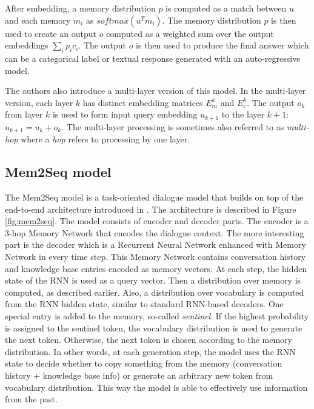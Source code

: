 After embedding, a memory distribution $p$ is computed as a match between $u$ and each memory $m_i$ as $softmax (u^Tm_i)$.
The memory distribution $p$ is then used to create an output $o$ computed as a weighted sum over the output embeddings $\sum_i p_ic_i$.
The output $o$ is then used to produce the final answer which can be a categorical label or textual response generated with an auto-regressive model.

The authors also introduce a multi-layer version of this model.
In the multi-layer version, each layer $k$ has distinct embedding matrices $E^k_m$ and $E^k_c$. The output $o_k$ from layer $k$ is used to form input query embedding $u_{k+1}$ to the layer $k+1$: $u_{k+1} = u_k + o_k$.
The multi-layer processing is sometimes also referred to as \emph{multi-hop} where a \emph{hop} refers to processing by one layer.

\subsection{Mem2Seq model}
\label{02:sec:mem2seq}
The Mem2Seq model \cite{madotto-etal-2018-mem2seq} is a task-oriented dialogue model that builds on top of the end-to-end architecture introduced in \citet{sukhbaatar2015end}.
The architecture is described in Figure \ref{fig:mem2seq}.
The model consists of encoder and decoder parts.
The encoder is a 3-hop Memory Network that encodes the dialogue context.
The more interesting part is the decoder which is a Recurrent Neural Network enhanced with Memory Network in every time step.
This Memory Network contains conversation history and knowledge base entries encoded as memory vectors.
At each step, the hidden state of the RNN is used as a query vector. Then a distribution over memory is computed, as described earlier. 
Also, a distribution over vocabulary is computed from the RNN hidden state, similar to standard RNN-based decoders.
One special entry is added to the memory, so-called \emph{sentinel}.
If the highest probability is assigned to the sentinel token, the vocabulary distribution is used to generate the next token.
Otherwise, the next token is chosen according to the memory distribution.
In other words, at each generation step, the model uses the RNN state to decide whether to copy something from the memory (conversation history + knowledge base info) or generate an arbitrary new token from vocabulary distribution.
This way the model is able to effectively use information from the past.

